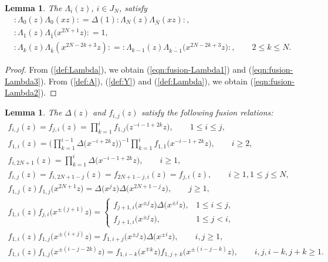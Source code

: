 \documentclass[pdftex]{sigma}
\numberwithin{equation}{section}
\newtheorem{Lemma}[Theorem]{Lemma}
\begin{document}
\begin{Lemma}
The $\Lambda_i(z)$, $i \in J_N$, satisfy
\begin{gather}
{:}\Lambda_0(z)\Lambda_0(xz){:}=\Delta(1){:}\Lambda_N(z)\Lambda_{\bar{N}}(xz){:},
\label{eqn:fusion-Lambda1}
\\
{:}\Lambda_1(z)\Lambda_{\bar{1}}\big(x^{2N+1}z\big){:}=1,
\label{eqn:fusion-Lambda2}
\\
{:}\Lambda_k(z)\Lambda_{\bar{k}}(x^{2N-2k+3}z){:}=
{:}\Lambda_{k-1}(z)\Lambda_{\overline{k-1}}\big(x^{2N-2k+3}z\big){:},\qquad
2\leq k \leq N.
\label{eqn:fusion-Lambda3}
\end{gather}
\end{Lemma}

\begin{proof}
From (\ref{def:Lambda}), we obtain (\ref{eqn:fusion-Lambda1}) and (\ref{eqn:fusion-Lambda3}).
From (\ref{def:A}), (\ref{def:Y}) and (\ref{def:Lambda}), we obtain (\ref{eqn:fusion-Lambda2}).
\end{proof}


\begin{Lemma}
The $\Delta(z)$ and $f_{i,j}(z)$ satisfy the following fusion relations:
\begin{gather}
f_{i,j}(z)=f_{j,i}(z)=\prod_{k=1}^i f_{1,j}\big(z^{-i-1+2k}z\big),\qquad
1\leq i \leq j,
\label{eqn:fusion-f1}
\\
f_{1,i}(z)=\Bigg(\prod_{k=1}^{i-1}\Delta\big(x^{-i+2k}z\big)\Bigg)^{-1}
\prod_{k=1}^i f_{1,1}\big(x^{-i-1+2k}z\big),\qquad
i \geq 2,
\label{eqn:fusion-f2}
\\
f_{i,2N+1}(z)=\prod_{k=1}^{i}\Delta\big(x^{-i-1+2k}z\big),\qquad i \geq 1,
\label{eqn:fusion-f3}
\\
f_{i, j}(z)=f_{i, 2N+1-j}(z)=
f_{2N+1-j, i}(z)=f_{j,i}(z),\qquad
i \geq 1, 1\leq j \leq N,
\label{eqn:fusion-f3(2)}
\\
f_{1,j}(z)f_{1,j}\big(x^{2N+1}z\big)=
\Delta\big(x^j z\big)\Delta\big(x^{2N+1-j}z\big),\qquad j \geq 1,
\label{eqn:fusion-f3(3)}
\\
f_{1,i}(z)f_{j,i}\big(x^{\pm (j+1)}z\big)=\begin{cases}
f_{j+1,i}\big(x^{\pm j}z\big)\Delta\big(x^{\pm i}z\big),& 1\leq i \leq j,
\\
f_{j+1,i}\big(x^{\pm j}z\big),& 1\leq j<i,
\end{cases}
\label{eqn:fusion-f4}
\\
f_{1,i}(z)f_{1,j}\big(x^{\pm (i+j)}z\big)=
f_{1,i+j}\big(x^{\pm j}z\big)\Delta\big(x^{\pm i}z\big),\qquad
i,j \geq 1,
\label{eqn:fusion-f5}
\\
f_{1,i}(z)f_{1,j}\big(x^{\pm (i-j-2k)}z\big)=
f_{1,i-k}\big(x^{\mp k}z\big)f_{1,j+k}\big(x^{\pm (i-j-k)}z\big),\qquad
i,j,i-k,j+k \geq 1.
\label{eqn:fusion-f6}
\end{gather}
\end{Lemma}
\end{document}
